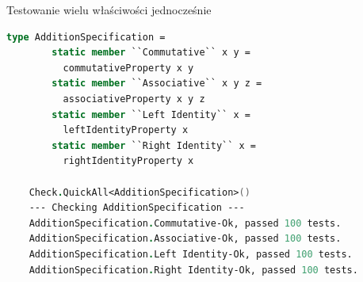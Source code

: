     \begin{frame}[fragile]{Testowanie wielu właściwości jednocześnie}
    \begin{lstlisting}[language=FSharp, xleftmargin=-10pt,xrightmargin=-10pt,numbers=none,basicstyle=\ttfamily\small]
    type AdditionSpecification =
        static member ``Commutative`` x y =
          commutativeProperty x y
        static member ``Associative`` x y z =
          associativeProperty x y z
        static member ``Left Identity`` x =
          leftIdentityProperty x
        static member ``Right Identity`` x =
          rightIdentityProperty x
    
    Check.QuickAll<AdditionSpecification>()
    --- Checking AdditionSpecification ---
    AdditionSpecification.Commutative-Ok, passed 100 tests.
    AdditionSpecification.Associative-Ok, passed 100 tests.
    AdditionSpecification.Left Identity-Ok, passed 100 tests.
    AdditionSpecification.Right Identity-Ok, passed 100 tests.
    \end{lstlisting}
    \end{frame}